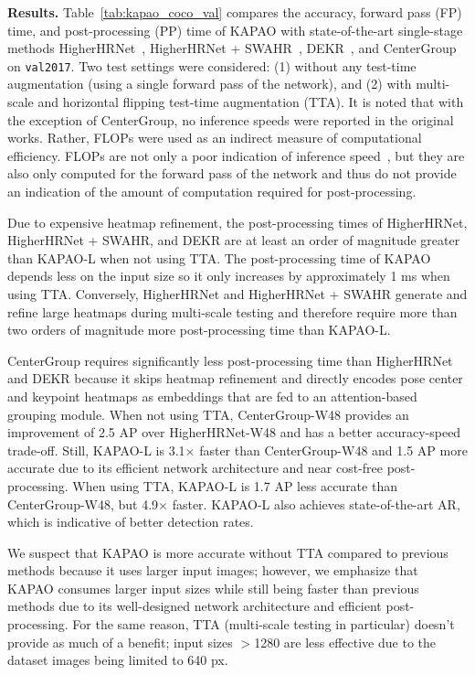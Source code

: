 \documentclass[runningheads]{llncs}
\newcommand\hll[1]{\bgroup
  \hskip0pt\color{black}#1\egroup
}
\newcommand\hlll[1]{\bgroup
  \hskip0pt\color{black}#1\egroup
}
\begin{document}
\medskip\noindent\textbf{Results.} Table~\ref{tab:kapao_coco_val} compares the accuracy, forward pass (FP) time, and post-processing (PP) time of KAPAO with state-of-the-art single-stage methods HigherHRNet~\cite{cheng2020higherhrnet}, \hll{HigherHRNet + SWAHR~\cite{luo2021rethinking}, DEKR~\cite{geng2021bottom}, and CenterGroup~\cite{braso2021center}} on \texttt{val2017}. Two test settings were considered: (1) without any test-time augmentation (using a single forward pass of the network), and (2) with multi-scale and horizontal flipping test-time augmentation (TTA). It is noted that with the exception of CenterGroup, no inference speeds were reported in the original works. Rather, FLOPs were used as an indirect measure of computational efficiency. FLOPs are not only a poor indication of inference speed~\cite{ding2021repvgg}, but they are also only computed for the forward pass of the network and \hlll{thus} do not provide an indication of the amount of computation required for post-processing.

Due to expensive heatmap refinement, the post-processing times of HigherHRNet, HigherHRNet + SWAHR, and DEKR are at least an order of magnitude greater than KAPAO-L when not using TTA. The post-processing time of KAPAO depends less on the input size so it only increases by approximately 1 ms when using TTA. Conversely, HigherHRNet and HigherHRNet + SWAHR generate and refine large heatmaps during multi-scale testing and therefore require more than two orders of magnitude more post-processing time than KAPAO-L.

CenterGroup requires significantly less post-processing time than HigherHRNet and DEKR because it skips heatmap refinement and directly encodes pose center and keypoint heatmaps as embeddings that are fed to an attention-based grouping module. When not using TTA, CenterGroup-W48 provides an improvement of 2.5 AP over HigherHRNet-W48 and has a better accuracy-speed trade-off. \hlll{Still,} KAPAO-L is 3.1$\times$ faster than CenterGroup-W48 and 1.5 AP more accurate due to its efficient network architecture and near cost-free post-processing. When using TTA, KAPAO-L is \hlll{1.7 AP less accurate} than CenterGroup-W48, but 4.9$\times$ faster. KAPAO-L also achieves state-of-the-art AR, which is indicative of better detection rates. 

\hlll{We suspect that KAPAO is more accurate without TTA compared to previous methods because it uses larger input images; however, we emphasize that KAPAO consumes larger input sizes while still being faster than previous methods due to its well-designed network architecture and efficient post-processing. For the same reason, TTA (multi-scale testing in particular) doesn't provide as much of a benefit; input sizes $>$1280 are less effective due to the dataset images being limited to 640 px.} 
\end{document}
